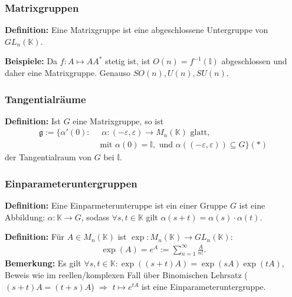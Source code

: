 \documentclass[11pt]{beamer}
\begin{document}
\begin{frame}
	\frametitle{Matrixgruppen}
	\textbf{Definition:}
	Eine Matrixgruppe ist eine abgeschlossene
	Untergruppe von $GL_n(\mathbb{K})$. \\[1em] \pause

	\textbf{Beispiele:}
	Da $f:A \mapsto AA^*$ stetig ist, ist $O(n) = f^{-1}(\mathbb{I})$ abgeschlossen
	und daher eine Matrixgruppe. Genauso $SO(n),U(n), SU(n)$. \\[1em]
\end{frame}

\begin{frame}
	\frametitle{Tangentialräume}
	\textbf{Definition:}
	Ist $G$ eine Matrixgruppe, so ist
	\begin{align*}
		\mathfrak{g} := \{ \alpha'(0): & \;\; \alpha:(-\varepsilon, \varepsilon) \rightarrow M_n(\mathbb{K}) \text{ glatt},\\
										&\text{ mit } \alpha(0) = \mathbb{I}, \text{ und } \alpha((-\varepsilon, \varepsilon)) \subseteq G\} (*)
	\end{align*}
  der Tangentialraum von $G$ bei $\mathbb{I}$.
\end{frame}


\begin{frame}
	\frametitle{Einparameteruntergruppen}
	\textbf{Definition:}
	Eine Einparmeterunteruppe ist ein einer Gruppe $G$ ist eine Abbildung:
	$\alpha:\mathbb{K} \rightarrow G$, sodass $\forall s, t \in \mathbb{K}$ gilt
	$\alpha(s+t) = \alpha(s)\cdot \alpha(t)$. \\[1em] \pause

	\textbf{Definition:}
	Für $A \in M_n(\mathbb{K})$ ist $\exp: M_n(\mathbb K) \to GL_n(\mathbb K)$:
	\begin{align*}
	\exp(A) = e^A := \sum_{n = 1}^{\infty} \frac{A}{n!}.
	\end{align*} \pause
	\textbf{Bemerkung:}
	Es gilt $\forall s,t\in \mathbb K: \exp((s+t)A) = \exp(sA) \exp(tA)$, Beweis wie im reellen/komplexen Fall über Binomischen Lehrsatz ($(s+t)A = (t+s)A$) $\Rightarrow$ $t\mapsto e^{tA}$ ist eine Einparameteruntergruppe.
\end{frame}
\end{document}
